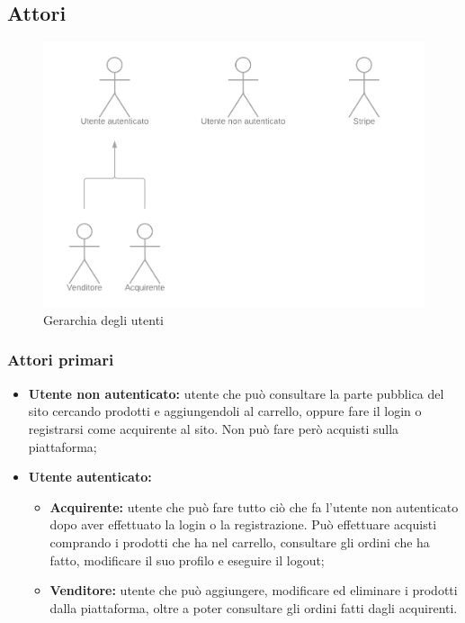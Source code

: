 \subsection{Attori} \label{Attori}

\begin{figure}[ht]
    \centering
    \includegraphics[width=\textwidth]{Immagini/DiagrammiUC/Attori.png}
    \caption{Gerarchia degli utenti} 
    \label{fig:Registrazione}
\end{figure}

\subsubsection{Attori primari}
\begin{itemize}
    \item \textbf{Utente non autenticato:} utente che può consultare la parte pubblica del sito cercando prodotti e aggiungendoli al carrello, oppure fare il login o registrarsi come acquirente al sito. Non può fare però acquisti sulla piattaforma;
    \item \textbf{Utente autenticato:}
    \begin{itemize}
        \item \textbf{Acquirente:} utente che può fare tutto ciò che fa l'utente non autenticato dopo aver effettuato la login o la registrazione. Può effettuare acquisti comprando i prodotti che ha nel carrello, consultare gli ordini che ha fatto, modificare il suo profilo e eseguire il logout;
        \item \textbf{Venditore:} utente che può aggiungere, modificare ed eliminare i prodotti dalla piattaforma, oltre a poter consultare gli ordini fatti dagli acquirenti.
    \end{itemize}
\end{itemize}
